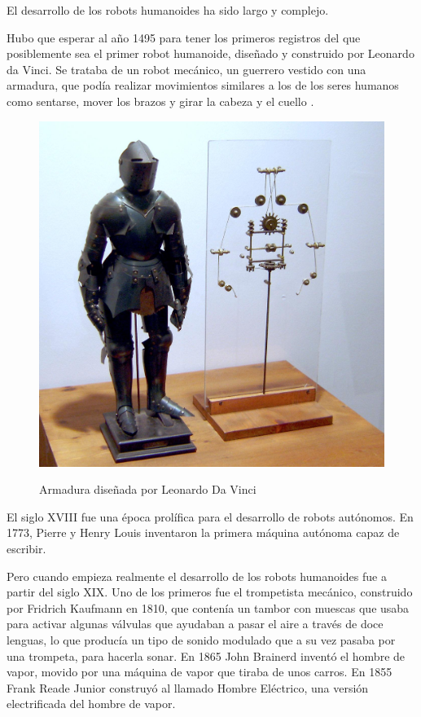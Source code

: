 El desarrollo de los robots humanoides ha sido largo y complejo.

Hubo que esperar al año 1495 para tener los primeros registros del que posiblemente sea el primer robot humanoide, diseñado y construido por Leonardo da Vinci. Se trataba de un robot mecánico, un guerrero vestido con una armadura, que podía realizar movimientos similares a los de los seres humanos como sentarse, mover los brazos y girar la cabeza y el cuello \cite{ref7}.

\begin{figure}[H]
\centering
{\includegraphics[scale=0.1]{imagenes/apartado_2/26_robot_LeonardoDaVinci}}
\caption{Armadura diseñada por Leonardo Da Vinci}
\label{figura26}
\end{figure}

El siglo XVIII fue una época prolífica para el desarrollo de robots autónomos. En 1773, Pierre y Henry Louis inventaron la primera máquina autónoma capaz de escribir.

Pero cuando empieza realmente el desarrollo de los robots humanoides fue a partir del siglo XIX. Uno de los primeros fue el trompetista mecánico, construido por Fridrich Kaufmann en 1810, que contenía un tambor con muescas que usaba para activar algunas válvulas que ayudaban a pasar el aire a través de doce lenguas, lo que producía un tipo de sonido modulado que a su vez pasaba por una trompeta, para hacerla sonar. En 1865 John Brainerd inventó el hombre de vapor, movido por una máquina de vapor que tiraba de unos carros. En 1855 Frank Reade Junior construyó al llamado Hombre Eléctrico, una versión electrificada del hombre de vapor.

